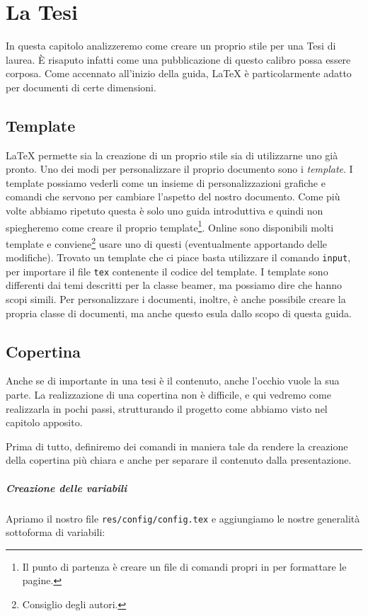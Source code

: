 \chapter{La Tesi}
In questa capitolo analizzeremo come creare un proprio stile per una Tesi di
laurea. È risaputo infatti come una pubblicazione di questo calibro possa
essere corposa. Come accennato all'inizio della guida, \LaTeX{} è
particolarmente adatto per documenti di certe dimensioni.

\section{Template}
\LaTeX{} permette sia la creazione di un proprio stile sia di utilizzarne uno 
già pronto. Uno dei modi per personalizzare il proprio documento sono i\textit{
template}. I template possiamo vederli come un insieme di personalizzazioni 
grafiche e comandi che servono per cambiare l'aspetto del nostro documento. 
Come più volte abbiamo ripetuto questa è solo uno guida introduttiva e quindi 
non spiegheremo come creare il proprio template\footnote{Il punto di partenza 
è creare un file di comandi propri in per formattare le pagine.}. Online sono 
disponibili molti template e conviene\footnote{Consiglio degli autori.} usare 
uno di questi (eventualmente apportando delle modifiche). Trovato un template 
che ci piace basta utilizzare il comando \texttt{input}, per importare il file 
\texttt{tex} contenente il codice del template. I template sono differenti dai 
temi descritti per la classe beamer, ma possiamo dire che hanno scopi simili. 
Per personalizzare i documenti, inoltre, è anche possibile creare la propria 
classe di documenti, ma anche questo esula dallo scopo di questa guida.

\section{Copertina}
Anche se di importante in una tesi è il contenuto, anche l'occhio vuole la sua
parte. La realizzazione di una copertina non è difficile, e qui vedremo come
realizzarla in pochi passi, strutturando il progetto come abbiamo visto nel
capitolo apposito. %

Prima di tutto, definiremo dei comandi in maniera tale da rendere la creazione
della copertina più chiara e anche per separare il contenuto dalla
presentazione.

\paragraph*{Creazione delle variabili} Apriamo il nostro file
\texttt{res/config/config.tex} e aggiungiamo le nostre generalità sottoforma di
variabili:

